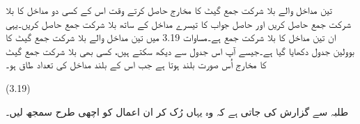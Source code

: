	
	تین مداخل والے بلا شرکت جمع گیٹ کا مخارج حاصل کرتے وقت اس کے کسی دو مداخل کا بلا شرکت جمع حاصل کریں اور حاصل جواب کا تیسرے مداخل کے ساتھ بلا شرکت جمع حاصل کریں۔یہی ان تین مداخل کا بلا شرکت جمع ہے۔مساوات 3.19 میں تین مداخل والے بلا شرکت جمع گیٹ کا بوولین جدول دکھایا گیا ہے۔جیسے آپ اس جدول سے دیکھ سکتے ہیں، کسی بھی بلا شرکت جمع گیٹ کا مخارج اُس صورت بلند ہوتا ہے جب اس کے بلند مداخل کی تعداد طاق ہو۔

 
(3.19)



	طلبہ سے گزارش کی جاتی ہے کہ وہ یہاں رُک کر ان اعمال کو اچھی طرح سمجھ لیں۔

